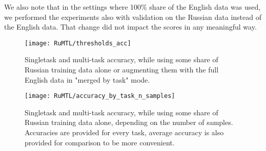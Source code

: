 \begin{table*}
We also note that in the settings where 100\% share of the English data was used, we performed the experiments also with validation on the Russian data instead of the English data. That change did not impact the scores in any meaningful way.

\begin{figure}[ht]
    \texttt{[image: RuMTL/thresholds\_acc]}
  \caption{Singletask and multi-task accuracy, while using some share of Russian training data alone or augmenting them with the full English data in "merged by task" mode.}\label{fig:thresholds_acc}
\end{figure}
\begin{figure}[ht]
    \texttt{[image: RuMTL/accuracy\_by\_task\_n\_samples]}
  \caption{Singletask and multi-task accuracy, while using some share of Russian training data alone, depending on the number of samples. Accuracies are provided for every task, average accuracy is also provided for comparison to be more convenient.}\label{fig:accuracy_by_task_n_samples}
\end{figure}


 
 
\end{table*}
